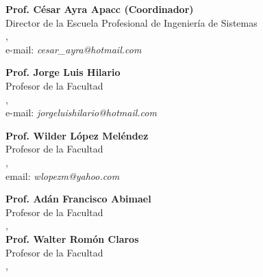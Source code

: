 \begin{center}
\textbf{Prof. César Ayra Apacc (Coordinador)}\\
Director de la Escuela Profesional de Ingenierí­a de Sistemas\\
\institution, \city\\
e-mail: \textit{cesar\_ayra@hotmail.com}

\textbf{Prof. Jorge Luis Hilario}\\
Profesor de la Facultad\\
\institution, \city\\
e-mail: \textit{jorgeluishilario@hotmail.com}

\textbf{Prof. Wilder López Meléndez}\\
Profesor de la Facultad \\
\institution, \city\\
email: \textit{wlopezm@yahoo.com}

\textbf{Prof. Adán Francisco Abimael}\\
Profesor de la Facultad\\
\institution, \city\\

\textbf{Prof. Walter Romón Claros}\\
Profesor de la Facultad\\
\institution, \city\\
\end{center}